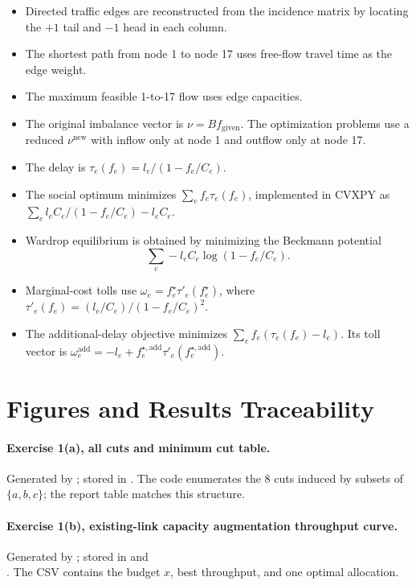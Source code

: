 \documentclass[11pt,a4paper]{article}
\begin{document}
\begin{itemize}
    \begin{itemize}
        \item Directed traffic edges are reconstructed from the incidence matrix by locating the $+1$ tail and $-1$ head in each column.
        \item The shortest path from node 1 to node 17 uses free-flow travel time as the edge weight.
        \item The maximum feasible 1-to-17 flow uses edge capacities.
        \item The original imbalance vector is $\nu=B f_{\text{given}}$. The optimization problems use a reduced $\nu^{\mathrm{new}}$ with inflow only at node 1 and outflow only at node 17.
        \item The delay is $\tau_e(f_e)=l_e/(1-f_e/C_e)$.
        \item The social optimum minimizes $\sum_e f_e\tau_e(f_e)$, implemented in CVXPY as $\sum_e l_e C_e/(1-f_e/C_e)-l_e C_e$.
        \item Wardrop equilibrium is obtained by minimizing the Beckmann potential
        \[
            \sum_e -l_e C_e\log(1-f_e/C_e).
        \]
        \item Marginal-cost tolls use $\omega_e=f^\star_e\tau'_e(f^\star_e)$, where $\tau'_e(f_e)=(l_e/C_e)/(1-f_e/C_e)^2$.
        \item The additional-delay objective minimizes $\sum_e f_e(\tau_e(f_e)-l_e)$. Its toll vector is $\omega^{\mathrm{add}}_e=-l_e+f^{\star,\mathrm{add}}_e\tau'_e(f^{\star,\mathrm{add}}_e)$.
    \end{itemize}
\end{itemize}

\section{Figures and Results Traceability}

\paragraph{Exercise 1(a), all cuts and minimum cut table.}
Generated by ; stored in . The code enumerates the 8 cuts induced by subsets of $\{a,b,c\}$; the report table matches this structure.

\paragraph{Exercise 1(b), existing-link capacity augmentation throughput curve.}
Generated by ; stored in  and\\ . The CSV contains the budget $x$, best throughput, and one optimal allocation.
\end{document}
